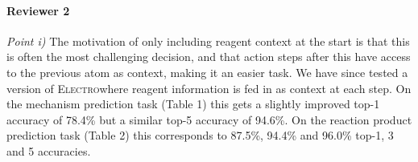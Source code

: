 \documentclass{article}
\newcommand{\ourModel}{\textsc{Electro}}
\begin{document}
% 




\paragraph{Reviewer 2}
\emph{Point i)}
The motivation of only including reagent context at the start is that this is often the most challenging decision, and that action steps after this have access to the previous atom as context, making it an easier task.
We have since tested a version of \ourModel where reagent information is fed in as context at each step. 
On the mechanism prediction task (Table 1) this gets a slightly improved top-1 accuracy of 78.4\% but a similar top-5 accuracy of 94.6\%.
 On the reaction product prediction task (Table 2) this corresponds to 87.5\%, 94.4\% and 96.0\% top-1, 3 and 5 accuracies.
\end{document}
